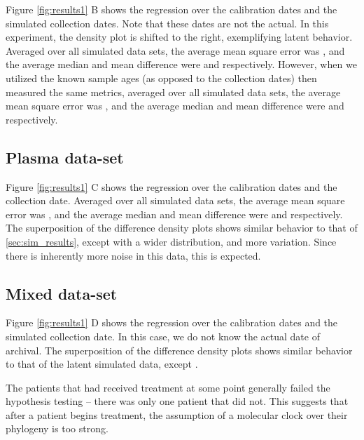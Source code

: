 Figure \ref{fig:results1} B shows the regression over the calibration dates and the simulated collection dates. Note that these dates are not the actual. In this experiment, the density plot is shifted to the right, exemplifying latent behavior. Averaged over all simulated data sets, the average mean square error was , and the average median and mean difference were  and  respectively. However, when we utilized the known sample ages (as opposed to the collection dates) then measured the same metrics, averaged over all simulated data sets, the average mean square error was , and the average median and mean difference were  and  respectively.

\subsection{Plasma data-set} \label{sec:rna_only}

Figure \ref{fig:results1} C shows the regression over the calibration dates and the collection date. Averaged over all simulated data sets, the average mean square error was , and the average median and mean difference were  and  respectively. The superposition of the difference density plots shows similar behavior to that of \ref{sec:sim_results}, except with a wider distribution, and more variation. Since there is inherently more noise in this data, this is expected. 

\subsection{Mixed data-set} \label{sec:mixed_data}

Figure \ref{fig:results1} D shows the regression over the calibration dates and the simulated collection date. In this case, we do not know the actual date of archival.  The superposition of the difference density plots shows similar behavior to that of the latent simulated data, except .  

The patients that had received treatment at some point generally failed the hypothesis testing -- there was only one patient that did not. This suggests that after a patient begins treatment, the assumption of a molecular clock over their phylogeny is too strong. 
